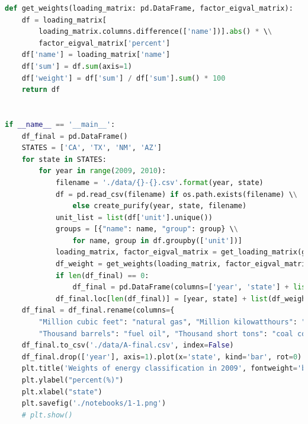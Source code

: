 \documentclass[a4paper,11pt]{article}
\begin{document}
\begin{appendices}
\begin{lstlisting}[language=Python, caption=profile.py]
def get_weights(loading_matrix: pd.DataFrame, factor_eigval_matrix):
    df = loading_matrix[
        loading_matrix.columns.difference(['name'])].abs() * \\
        factor_eigval_matrix['percent']
    df['name'] = loading_matrix['name']
    df['sum'] = df.sum(axis=1)
    df['weight'] = df['sum'] / df['sum'].sum() * 100
    return df


if __name__ == '__main__':
    df_final = pd.DataFrame()
    STATES = ['CA', 'TX', 'NM', 'AZ']
    for state in STATES:
        for year in range(2009, 2010):
            filename = './data/{}-{}.csv'.format(year, state)
            df = pd.read_csv(filename) if os.path.exists(filename) \\
                else create_purify(year, state, filename)
            unit_list = list(df['unit'].unique())
            groups = [{"name": name, "group": group} \\
                for name, group in df.groupby(['unit'])]
            loading_matrix, factor_eigval_matrix = get_loading_matrix(groups)
            df_weight = get_weights(loading_matrix, factor_eigval_matrix)
            if len(df_final) == 0:
                df_final = pd.DataFrame(columns=['year', 'state'] + list(df_weight['name']))
            df_final.loc[len(df_final)] = [year, state] + list(df_weight['weight'])
    df_final = df_final.rename(columns={
        "Million cubic feet": "natural gas", "Million kilowatthours": "electricity",
        "Thousand barrels": "fuel oil", "Thousand short tons": "coal coke"})
    df_final.to_csv('./data/A-final.csv', index=False)
    df_final.drop(['year'], axis=1).plot(x='state', kind='bar', rot=0)
    plt.title('Weights of energy classification in 2009', fontweight='bold')
    plt.ylabel("percent(%)")
    plt.xlabel("state")
    plt.savefig('./notebooks/1-1.png')
    # plt.show()

\end{lstlisting}
\end{appendices}
\end{document}

